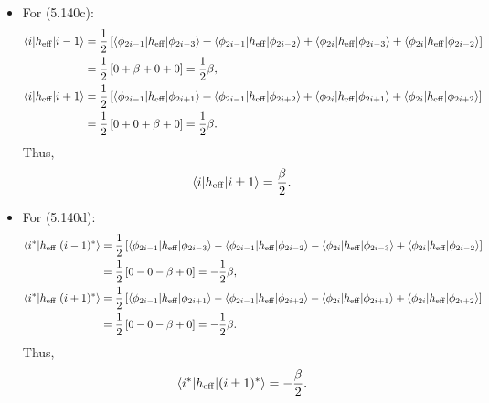 \documentclass[a4paper]{book}
\newcounter{solution}[chapter]
\newcommand{\heff}{h_{\rm eff}}
\begin{document}
\begin{solution}
\begin{itemize}
	\item For (5.140c):
	\begin{align*}
		\langle i | \heff | i-1 \rangle &= \frac{1}{2} \left[ \langle \phi_{2i-1} | \heff | \phi_{2i-3} \rangle + \langle \phi_{2i-1} | \heff | \phi_{2i-2} \rangle + \langle \phi_{2i} | \heff | \phi_{2i-3} \rangle + \langle \phi_{2i} | \heff | \phi_{2i-2} \rangle \right] \\
		&= \frac{1}{2} \left[ 0 + \beta + 0 + 0 \right] = \frac{1}{2} \beta , \\
		\langle i | \heff | i+1 \rangle &= \frac{1}{2} \left[ \langle \phi_{2i-1} | \heff | \phi_{2i+1} \rangle + \langle \phi_{2i-1} | \heff | \phi_{2i+2} \rangle + \langle \phi_{2i} | \heff | \phi_{2i+1} \rangle + \langle \phi_{2i} | \heff | \phi_{2i+2} \rangle \right] \\
		&= \frac{1}{2} \left[ 0 + 0 + \beta + 0 \right] = \frac{1}{2} \beta .
	\end{align*}
	Thus,
	\[
		\langle i | \heff | i \pm 1 \rangle = \frac{\beta}{2}.
	\]
	
	\item For (5.140d):
	\begin{align*}
		\langle i^* | \heff | (i-1)^* \rangle &= \frac{1}{2} \left[ \langle \phi_{2i-1} | \heff | \phi_{2i-3} \rangle - \langle \phi_{2i-1} | \heff | \phi_{2i-2} \rangle - \langle \phi_{2i} | \heff | \phi_{2i-3} \rangle + \langle \phi_{2i} | \heff | \phi_{2i-2} \rangle \right] \\
		&= \frac{1}{2} \left[ 0 - 0 - \beta + 0 \right] = -\frac{1}{2} \beta , \\
		\langle i^* | \heff | (i+1)^* \rangle &= \frac{1}{2} \left[ \langle \phi_{2i-1} | \heff | \phi_{2i+1} \rangle - \langle \phi_{2i-1} | \heff | \phi_{2i+2} \rangle - \langle \phi_{2i} | \heff | \phi_{2i+1} \rangle + \langle \phi_{2i} | \heff | \phi_{2i+2} \rangle \right] \\
		&= \frac{1}{2} \left[ 0 - 0 - \beta + 0 \right] = -\frac{1}{2} \beta .
	\end{align*}
	Thus,
	\[
		\langle i^* | \heff | (i \pm 1)^* \rangle = -\frac{\beta}{2}.
	\]
	

\end{itemize}
\end{solution}
\end{document}
